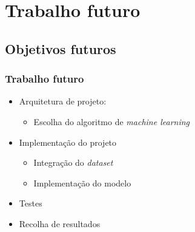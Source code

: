 \documentclass{beamer}
\begin{document}
\section[Trabalho futuro]{Trabalho futuro}
\subsection{Objetivos futuros}
\begin{frame}
\frametitle{Trabalho futuro}

\begin{itemize}
	\item Arquitetura de projeto:
		  \begin{itemize}
			  \item Escolha do algoritmo de \textit{machine learning}
		  \end{itemize} 
	\item Implementação do projeto
		  \begin{itemize}
		      \item Integração do \textit{dataset}
		      \item Implementação do modelo
		  \end{itemize}
	\item Testes
	\item Recolha de resultados
\end{itemize}

\end{frame}
\end{document}
